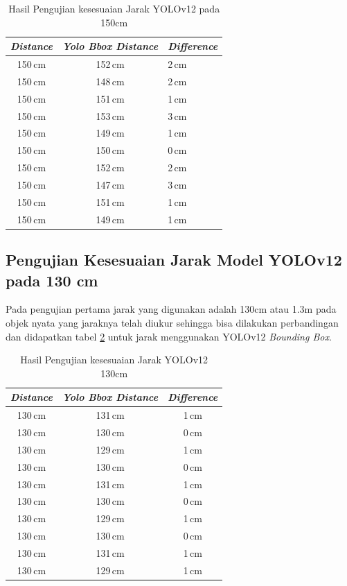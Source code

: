 \begin{table}[H]
  \centering
  \caption{Hasil Pengujian kesesuaian Jarak YOLOv12 pada 150cm}
  \label{tb:pengukurankesusaian150cmv12}
  \begin{tabular}{|c|c|l|}
    \hline
    \textit{Distance} & \textit{Yolo Bbox Distance} & \textit{Difference} \\ \hline
    150\,cm & 152\,cm & 2\,cm \\ \hline
    150\,cm & 148\,cm & 2\,cm \\ \hline
    150\,cm & 151\,cm & 1\,cm \\ \hline
    150\,cm & 153\,cm & 3\,cm \\ \hline
    150\,cm & 149\,cm & 1\,cm \\ \hline
    150\,cm & 150\,cm & 0\,cm \\ \hline
    150\,cm & 152\,cm & 2\,cm \\ \hline
    150\,cm & 147\,cm & 3\,cm \\ \hline
    150\,cm & 151\,cm & 1\,cm \\ \hline
    150\,cm & 149\,cm & 1\,cm \\ \hline
  \end{tabular}
\end{table}


\subsection{Pengujian Kesesuaian Jarak Model YOLOv12 pada 130 cm}
    
Pada pengujian pertama jarak yang digunakan adalah 130cm atau 1.3m pada objek nyata yang jaraknya telah diukur sehingga bisa dilakukan perbandingan dan didapatkan tabel \ref{tb:pengukurankesusaian130cmv12} untuk jarak menggunakan YOLOv12 \emph{Bounding Box}.

\begin{table}[H]
  \centering
  \caption{Hasil Pengujian kesesuaian Jarak YOLOv12 130cm}
  \label{tb:pengukurankesusaian130cmv12}
  \begin{tabular}{|c|c|c|}
    \hline
    \textit{Distance} & \textit{Yolo Bbox Distance} & \textit{Difference} \\ \hline
    130\,cm & 131\,cm & 1\,cm \\ \hline
    130\,cm & 130\,cm & 0\,cm \\ \hline
    130\,cm & 129\,cm & 1\,cm \\ \hline
    130\,cm & 130\,cm & 0\,cm \\ \hline
    130\,cm & 131\,cm & 1\,cm \\ \hline
    130\,cm & 130\,cm & 0\,cm \\ \hline
    130\,cm & 129\,cm & 1\,cm \\ \hline
    130\,cm & 130\,cm & 0\,cm \\ \hline
    130\,cm & 131\,cm & 1\,cm \\ \hline
    130\,cm & 129\,cm & 1\,cm \\ \hline
  \end{tabular}
\end{table}

